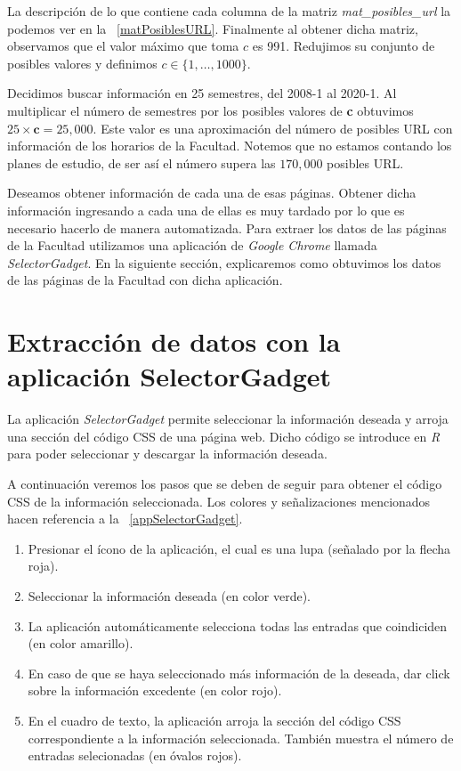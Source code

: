 La descripción de lo que contiene cada columna de la matriz \textit{mat\_posibles\_url} la podemos ver en la \tablename{~\ref{matPosiblesURL}}. Finalmente al obtener dicha matriz, observamos que el valor máximo que toma $c$ es 991. Redujimos su conjunto de posibles valores y definimos $c \in \{1, \ldots, 1 000\}$.

\dfNmatrizChica %

Decidimos buscar información en 25 semestres, del 2008-1 al 2020-1. Al multiplicar el número de semestres por los posibles valores de \textbf{c} obtuvimos $25 \times \textbf{c} = 25,000$. Este valor es una aproximación del número de posibles URL con información de los horarios de la Facultad. Notemos que no estamos contando los planes de estudio, de ser así el número supera las $170,000$ posibles URL.

Deseamos obtener información de cada una de esas páginas. Obtener dicha información ingresando a cada una de ellas es muy tardado por lo que es necesario hacerlo de manera automatizada. Para extraer los datos de las páginas de la Facultad utilizamos una aplicación de \textit{Google Chrome} llamada \textit{SelectorGadget}. En la siguiente sección, explicaremos como obtuvimos los datos de las páginas de la Facultad con dicha aplicación.

\section{Extracción de datos con la aplicación SelectorGadget} \label{sec_ED_SelectorGadget}

La aplicación \textit{SelectorGadget} permite seleccionar la información deseada y arroja una sección del código CSS de una página web. Dicho código se introduce en \textit{R} para poder seleccionar y descargar la información deseada.

A continuación veremos los pasos que se deben de seguir para obtener el código CSS de la información seleccionada. Los colores y señalizaciones mencionados hacen referencia a la \figurename{~\ref{appSelectorGadget}}. %

\begin{enumerate}
\item Presionar el ícono de la aplicación, el cual es una lupa (señalado por la flecha roja).

\item Seleccionar la información deseada (en color verde).

\item La aplicación automáticamente selecciona todas las entradas que coindiciden (en color amarillo).

\item En caso de que se haya seleccionado más información de la deseada, dar click sobre la información excedente (en color rojo).

\item  En el cuadro de texto, la aplicación arroja la sección del código CSS correspondiente a la información seleccionada. También muestra el número de entradas selecionadas (en óvalos rojos).
\end{enumerate}


